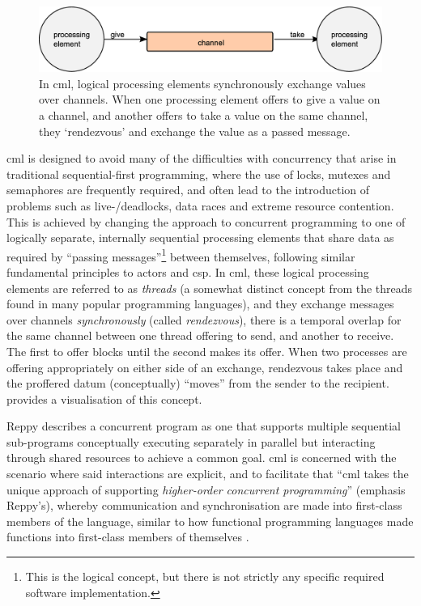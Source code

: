\begin{figure}
    \centering
    \includegraphics[width=\textwidth]{chapters/background/images/cml_exchange.eps}
    \caption[Diagram of the message-passing primitive in ]{In \gls{cml}, logical processing elements synchronously exchange values over channels.  When one processing element offers to give a value on a channel, and another offers to take a value on the same channel, they `rendezvous' and exchange the value as a passed message.}
    \label{fig:back:cml_exchange}
\end{figure}

\Gls{cml} is designed to avoid many of the difficulties with concurrency that arise in traditional sequential-first programming, where the use of locks, mutexes and semaphores \etc{} are frequently required, and often lead to the introduction of problems such as live-/deadlocks, data races and extreme resource contention.  This is achieved by changing the approach to concurrent programming to one of logically separate, internally sequential processing elements that share data as required by ``passing messages''\footnote{This is the logical concept, but there is not strictly any specific required software implementation.} between themselves, following similar fundamental principles to \glspl{actor} and \gls{csp}.  In \gls{cml}, these logical processing elements are referred to as \emph{threads} (a somewhat distinct concept from the threads found in many popular programming languages), and they exchange messages over channels \emph{synchronously} (called \emph{rendezvous}), \ie{} there is a temporal overlap for the same channel between one thread offering to send, and another to receive.  The first to offer blocks until the second makes its offer.  When two processes are offering appropriately on either side of an exchange, rendezvous takes place and the proffered datum (conceptually) ``moves'' from the sender to the recipient.   provides a visualisation of this concept.

Reppy describes a concurrent program as one that supports multiple sequential sub-programs conceptually executing separately in parallel but interacting through shared resources to achieve a common goal.  \Gls{cml} is concerned with the scenario where said interactions are explicit, and to facilitate that \enquote{\gls{cml} takes the unique approach of supporting \emph{higher-order concurrent programming}} (emphasis Reppy's), whereby communication and synchronisation are made into first-class members of the language, similar to how functional programming languages made functions into first-class members of themselves \cite[Preface]{Reppy2007}.
